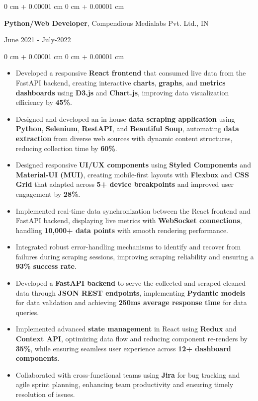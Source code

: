 \documentclass[10pt, letterpaper]{article}
\newenvironment{highlights}{
    \begin{itemize}[
        topsep=0.10 cm,
        parsep=0.10 cm,
        partopsep=0pt,
        itemsep=0pt,
        leftmargin=0 cm + 10pt
    ]
}{
    \end{itemize}
} %
\newenvironment{onecolentry}{
    \begin{adjustwidth}{
        0 cm + 0.00001 cm
    }{
        0 cm + 0.00001 cm
    }
}{
    \end{adjustwidth}
} %
\newenvironment{twocolentry}[2][]{
    \onecolentry
    \def\secondColumn{#2}
    \setcolumnwidth{\fill, 4.5 cm}
    \begin{paracol}{2}
}{
    \switchcolumn \raggedleft \secondColumn
    \end{paracol}
    \endonecolentry
} %
\begin{document}
\vspace{0.15 cm}
\begin{twocolentry}{
		June 2021 - July-2022
	}
	\textbf{Python/Web Developer}, Compendious Medialabs Pvt. Ltd., IN
\end{twocolentry}

\begin{onecolentry}
	\begin{highlights}
		\item Developed a responsive \textbf{React frontend} that consumed live data from the FastAPI backend, creating interactive \textbf{charts}, \textbf{graphs}, and \textbf{metrics dashboards} using \textbf{D3.js} and \textbf{Chart.js}, improving data visualization efficiency by \textbf{45\%}.
		\item Designed and developed an in-house \textbf{data scraping application} using \textbf{Python}, \textbf{Selenium}, \textbf{RestAPI}, and \textbf{Beautiful Soup}, automating \textbf{data extraction} from diverse web sources with dynamic content structures, reducing collection time by \textbf{60\%}.
		\item Designed responsive \textbf{UI/UX components} using \textbf{Styled Components} and \textbf{Material-UI (MUI)}, creating mobile-first layouts with \textbf{Flexbox} and \textbf{CSS Grid} that adapted across \textbf{5+ device breakpoints} and improved user engagement by \textbf{28\%}.
		\item Implemented real-time data synchronization between the React frontend and FastAPI backend, displaying live metrics with \textbf{WebSocket connections}, handling \textbf{10,000+ data points} with smooth rendering performance.
		\item Integrated robust error-handling mechanisms to identify and recover from failures during scraping sessions, improving scraping reliability and ensuring a \textbf{93\% success rate}.
		\item Developed a \textbf{FastAPI backend} to serve the collected and scraped cleaned data through \textbf{JSON REST endpoints}, implementing \textbf{Pydantic models} for data validation and achieving \textbf{250ms average response time} for data queries.
		\item Implemented advanced \textbf{state management} in React using \textbf{Redux} and \textbf{Context API}, optimizing data flow and reducing component re-renders by \textbf{35\%}, while ensuring seamless user experience across \textbf{12+ dashboard components}.
		\item Collaborated with cross-functional teams using \textbf{Jira} for bug tracking and agile sprint planning, enhancing team productivity and ensuring timely resolution of issues.
	\end{highlights}
\end{onecolentry}
\end{document}
